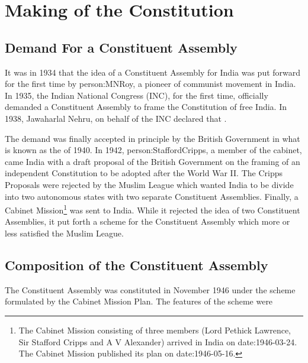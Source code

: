 \chapter{Making of the Constitution}

\section{Demand For a Constituent Assembly}

It was in 1934 that the idea of a Constituent Assembly for India was put forward for the first time by \gls{person:MNRoy}, a pioneer of communist movement in India. In 1935, the Indian National Congress (INC), for the first time, officially demanded a Constituent Assembly to frame the Constitution of free India. In 1938, Jawaharlal Nehru, on behalf of the INC declared that .

The demand was finally accepted in principle by the British Government in what is known as the  of 1940. In 1942, \gls{person:StaffordCripps}, a member of the cabinet, came India with a draft proposal of the British Government on the framing of an independent Constitution to be adopted after the World War II. The Cripps Proposals were rejected by the Muslim League which wanted India to be divide into two autonomous states with two separate Constituent Assemblies. Finally, a Cabinet Mission\footnote{The Cabinet Mission consisting of three members (Lord Pethick Lawrence, Sir Stafford Cripps and A V Alexander) arrived in India on \gls{date:1946-03-24}. The Cabinet Mission published its plan on \gls{date:1946-05-16}.} was sent to India. While it rejected the idea of two Constituent Assemblies, it put forth a scheme for the Constituent Assembly which more or less satisfied the Muslim League.

\section{Composition of the Constituent Assembly}

The Constituent Assembly was constituted in November 1946 under the scheme formulated by the Cabinet Mission Plan. The features of the scheme were

